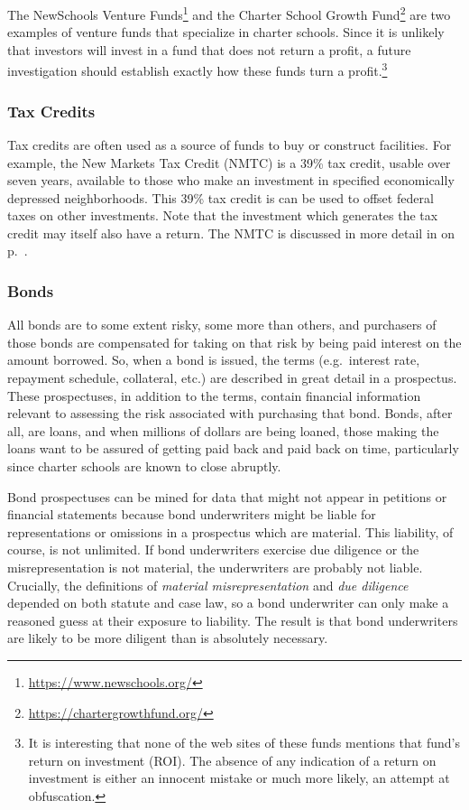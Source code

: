 The NewSchools Venture Funds\footnote{\url{https://www.newschools.org/}} and the Charter School Growth Fund\footnote{\url{https://chartergrowthfund.org/}} are two examples of venture funds that specialize in charter schools. Since it is unlikely that investors will invest in a fund that does not return a profit, a future investigation should establish exactly how these funds turn a profit.\footnote{It is interesting that none of the web sites of these funds mentions that fund's return on investment (ROI). The absence of any indication of a return on investment is either an innocent mistake or much more likely, an attempt at obfuscation.}

\subsubsection{Tax Credits}\label{sec:tax-credits}%

Tax credits are often used as a source of funds to buy or construct facilities. For example, the New Markets Tax Credit (NMTC) is a 39\% tax credit, usable over seven years, available to those who make an investment in specified economically depressed neighborhoods. This 39\% tax credit is can be used to offset federal taxes on other investments. Note that the investment which generates the tax credit may itself also have a return. The NMTC is discussed in more detail in  on p.~\pageref{sec:NMTC}.

\subsubsection{Bonds}\label{sec:bond-prospectuses}%

All bonds are to some extent risky, some more than others, and purchasers of those bonds are compensated for taking on that risk by being paid interest on the amount borrowed. So, when a bond is issued, the terms (e.g. interest rate, repayment schedule, collateral, etc.) are described in great detail in a prospectus. These prospectuses, in addition to the terms, contain financial information relevant to assessing the risk associated with purchasing that bond. Bonds, after all, are loans, and when millions of dollars are being loaned, those making the loans want to be assured of getting paid back and paid back on time, particularly since charter schools are known to close abruptly.

Bond prospectuses can be mined for data that might not appear in petitions or financial statements because bond underwriters might be liable for representations or omissions in a prospectus which are material. This liability, of course, is not unlimited. If bond underwriters exercise due diligence or the misrepresentation is not material, the underwriters are probably not liable. Crucially, the definitions of \textit{material misrepresentation} and \textit{due diligence} depended on both statute and case law, so a bond underwriter can only make a reasoned guess at their exposure to liability. The result is that bond underwriters are likely to be more diligent than is absolutely necessary.

